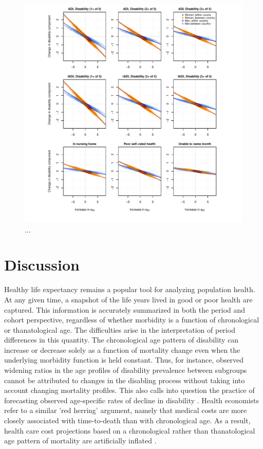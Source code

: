 \documentclass[11pt,oneside,a4paper]{article} %
\begin{document}
\begin{figure}
\begin{adjustwidth}{-1.5cm}{}
	\centering
	\includegraphics[scale=.8]{Decomp_3x3.pdf}
	\caption{...}
	\label{fig:Fig_Decomp_3x3}
\end{adjustwidth}
\end{figure}




\section{Discussion}

Healthy life expectancy remains a popular tool for analyzing population health. At any given time, a snapshot of the life years lived in good or poor health are captured. This information is accurately summarized in both the period and cohort perspective, regardless of whether morbidity is a function of chronological or thanatological age. The difficulties arise in the interpretation of period differences in this quantity. The chronological age pattern of disability can increase or decrease solely as a function of mortality change even when the underlying morbidity function is held constant. Thus, for instance, observed widening ratios in the age profiles of disability prevalence between subgroups \citep{Crimmins2001} cannot be attributed to changes in the disabling process without taking into account changing mortality profiles. This also calls into question the practice of forecasting observed age-specific rates of decline in disability \citep{Manton2006,Khaw1999}. Health economists refer to a similar 'red herring' argument, namely that medical costs are more closely associated with time-to-death than with chronological age. As a result, health care cost projections based on a chronological rather than thanatological age pattern of mortality are artificially inflated \citep{Zweifel1999,Geue2014}.
\end{document}

